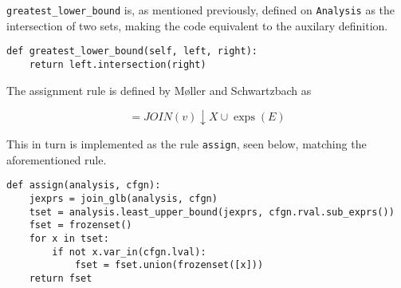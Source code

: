 \noindent \texttt{greatest\_lower\_bound} is, as mentioned previously, defined on \texttt{Analysis} as the intersection of two sets, making the code equivalent to the auxilary definition. 

\begin{verbatim}
def greatest_lower_bound(self, left, right): 
    return left.intersection(right)
\end{verbatim}

\noindent The assignment rule is defined by Møller and Schwartzbach as

\begin{equation*}
    [v]=J O I N(v) \downarrow X \cup \operatorname{exps}(E)
\end{equation*}

\noindent This in turn is implemented as the rule \texttt{assign}, seen below, matching the aforementioned rule. 

\begin{verbatim}
def assign(analysis, cfgn):
    jexprs = join_glb(analysis, cfgn)
    tset = analysis.least_upper_bound(jexprs, cfgn.rval.sub_exprs())
    fset = frozenset()
    for x in tset:
        if not x.var_in(cfgn.lval):
            fset = fset.union(frozenset([x]))
    return fset
\end{verbatim}